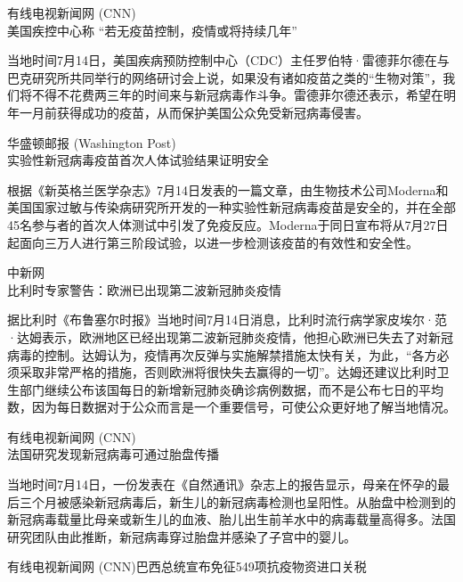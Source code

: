\documentclass[]{article}
\begin{document}
\begin{center}
\textcolor{glaucous}{有线电视新闻网 (CNN)}\\美国疾控中心称 “若无疫苗控制，疫情或将持续几年”
\end{center}

当地时间7月14日，美国疾病预防控制中心（CDC）主任罗伯特·雷德菲尔德在与巴克研究所共同举行的网络研讨会上说，如果没有诸如疫苗之类的``生物对策''，我们将不得不花费两三年的时间来与新冠病毒作斗争。雷德菲尔德还表示，希望在明年一月前获得成功的疫苗，从而保护美国公众免受新冠病毒侵害。

\begin{center}
\textcolor{glaucous}{华盛顿邮报 (Washington Post)}\\实验性新冠病毒疫苗首次人体试验结果证明安全
\end{center}

根据《新英格兰医学杂志》7月14日发表的一篇文章，由生物技术公司Moderna和美国国家过敏与传染病研究所开发的一种实验性新冠病毒疫苗是安全的，并在全部45名参与者的首次人体测试中引发了免疫反应。Moderna于同日宣布将从7月27日起面向三万人进行第三阶段试验，以进一步检测该疫苗的有效性和安全性。

\begin{center}
\textcolor{glaucous}{中新网}\\比利时专家警告：欧洲已出现第二波新冠肺炎疫情
\end{center}

据比利时《布鲁塞尔时报》当地时间7月14日消息，比利时流行病学家皮埃尔·范·达姆表示，欧洲地区已经出现第二波新冠肺炎疫情，他担心欧洲已失去了对新冠病毒的控制。达姆认为，疫情再次反弹与实施解禁措施太快有关，为此，``各方必须采取非常严格的措施，否则欧洲将很快失去赢得的一切''。达姆还建议比利时卫生部门继续公布该国每日的新增新冠肺炎确诊病例数据，而不是公布七日的平均数，因为每日数据对于公众而言是一个重要信号，可使公众更好地了解当地情况。

\begin{center}
\textcolor{glaucous}{有线电视新闻网 (CNN)}\\法国研究发现新冠病毒可通过胎盘传播
\end{center}

当地时间7月14日，一份发表在《自然通讯》杂志上的报告显示，母亲在怀孕的最后三个月被感染新冠病毒后，新生儿的新冠病毒检测也呈阳性。从胎盘中检测到的新冠病毒载量比母亲或新生儿的血液、胎儿出生前羊水中的病毒载量高得多。法国研究团队由此推断，新冠病毒穿过胎盘并感染了子宫中的婴儿。

\begin{center}
\textcolor{glaucous}{有线电视新闻网 (CNN)}巴西总统宣布免征549项抗疫物资进口关税
\end{center}
\end{document}

